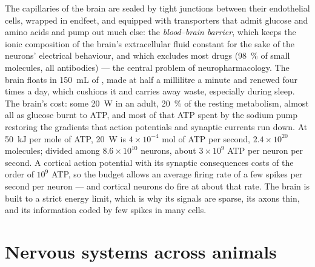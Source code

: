 \begin{proposition}\label{prop:b3:nervous-systems:barrier-budget}
The capillaries of the brain are sealed by tight junctions between
their endothelial cells, wrapped in  endfeet, and equipped
with transporters that admit glucose and amino acids and pump out
much else: the \emph{blood--brain barrier}, which keeps the ionic
composition of the brain's extracellular fluid constant for the sake of
the neurons' electrical behaviour, and which excludes most drugs
(\qty{98}{\%} of small molecules, all antibodies) --- the central
problem of neuropharmacology. The brain floats in \qty{150}{mL} of
\emph{}, made at half a millilitre a minute and
renewed four times a day, which cushions it and carries away waste,
especially during sleep. The brain's cost: some \qty{20}{W} in an adult,
\qty{20}{\%} of the resting metabolism, almost all as glucose burnt to
ATP, and most of that ATP spent by the sodium pump restoring the
gradients that action potentials and synaptic currents run down. At
\qty{50}{kJ} per mole of ATP, \qty{20}{W} is $4\times 10^{-4}$ mol
of ATP per second, $2.4\times 10^{20}$ molecules; divided among
$8.6\times 10^{10}$ neurons, about $3\times 10^{9}$ ATP per neuron per
second. A cortical action potential with its synaptic consequences costs
of the order of $10^{9}$ ATP, so the budget allows an average firing
rate of a few spikes per second per neuron --- and cortical neurons do
fire at about that rate. The brain is built to a strict energy limit,
which is why its signals are sparse, its axons thin, and its
information coded by few spikes in many cells.
\end{proposition}
\admitted

\section{Nervous systems across animals}


